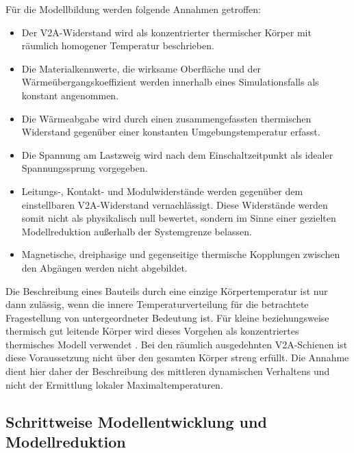 Für die Modellbildung werden folgende Annahmen getroffen:

\begin{itemize}
    \item Der V2A-Widerstand wird als konzentrierter thermischer Körper mit
          räumlich homogener Temperatur beschrieben.
    \item Die Materialkennwerte, die wirksame Oberfläche und der
          Wärmeübergangskoeffizient werden innerhalb eines Simulationsfalls als
          konstant angenommen.
    \item Die Wärmeabgabe wird durch einen zusammengefassten thermischen
          Widerstand gegenüber einer konstanten Umgebungstemperatur erfasst.
    \item Die Spannung am Lastzweig wird nach dem Einschaltzeitpunkt als
          idealer Spannungssprung vorgegeben.
    \item Leitungs-, Kontakt- und Modulwiderstände werden gegenüber dem
          einstellbaren V2A-Widerstand vernachlässigt. Diese Widerstände werden
          somit nicht als physikalisch null bewertet, sondern im Sinne einer
          gezielten Modellreduktion außerhalb der Systemgrenze belassen.
    \item Magnetische, dreiphasige und gegenseitige thermische Kopplungen
          zwischen den Abgängen werden nicht abgebildet.
\end{itemize}

Die Beschreibung eines Bauteils durch eine einzige Körpertemperatur ist nur
dann zulässig, wenn die innere Temperaturverteilung für die betrachtete
Fragestellung von untergeordneter Bedeutung ist. Für kleine beziehungsweise
thermisch gut leitende Körper wird dieses Vorgehen als konzentriertes
thermisches Modell verwendet \parencite[S.~30--33]{Griesinger_Waermemanagement}.
Bei den räumlich ausgedehnten V2A-Schienen ist diese Voraussetzung nicht über
den gesamten Körper streng erfüllt. Die Annahme dient hier daher der
Beschreibung des mittleren dynamischen Verhaltens und nicht der Ermittlung
lokaler Maximaltemperaturen.


\subsection{Schrittweise Modellentwicklung und Modellreduktion}
\label{sec:modellentwicklung_modellreduktion}

